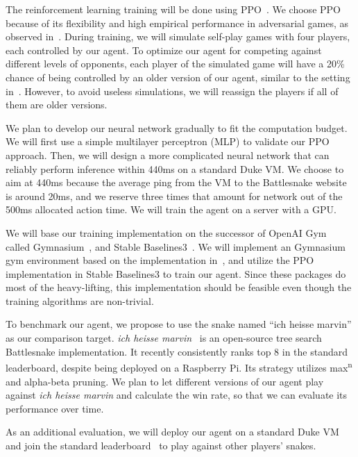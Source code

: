 \documentclass[a4paper]{article}
\begin{document}
The reinforcement learning training will be done using
PPO~\cite{schulman2017proximal}.
We choose PPO because of its flexibility and high empirical performance in
adversarial games,
as observed
in~\cite{berner2019dota,binnersley2020battlesnake,chung2020battlesnake}.
During training, we will simulate self-play games with four players,
each controlled by our agent.
To optimize our agent for competing against different levels of opponents,
each player of the simulated game will have a 20\% chance of being controlled by
an older version of our agent,
similar to the setting in~\cite{silver2017mastering}. However,
to avoid useless simulations,
we will reassign the players if all of them are older versions.

We plan to develop our neural network gradually to fit the computation budget.
We will first use a simple multilayer perceptron (MLP)
to validate our PPO approach. Then,
we will design a more complicated neural network that can reliably perform
inference within 440ms on a standard Duke VM.
We choose to aim at 440ms because the average ping from the VM to the
Battlesnake website is around 20ms,
and we reserve three times that amount for network out of the 500ms allocated
action time. We will train the agent on a server with a GPU.

We will base our training implementation on the successor of OpenAI
Gym~\cite{brockman2016openai} called Gymnasium~\cite{farama2024gymnasium},
and Stable Baselines3~\cite{raffin2024stable}.
We will implement an Gymnasium gym environment based on the implementation
in~\cite{chung2020battlesnake},
and utilize the PPO implementation in Stable Baselines3 to train our agent.
Since these packages do most of the heavy-lifting,
this implementation should be feasible even though the training algorithms are
non-trivial.

To benchmark our agent,
we propose to use the snake named ``ich heisse marvin'' as our comparison
target. \emph{ich heisse marvin}~\cite{wrenger2024rusty}
is an open-source tree search Battlesnake implementation.
It recently consistently ranks top 8 in the standard leaderboard,
despite being deployed on a Raspberry Pi. Its strategy utilizes
max\textsuperscript{n} and alpha-beta pruning.
We plan to let different versions of our agent play against \emph{ich heisse
    marvin} and calculate the win rate,
so that we can evaluate its performance over time.

As an additional evaluation,
we will deploy our agent on a standard Duke VM and join the standard
leaderboard~\cite{standard_leaderboard} to play against other players' snakes.
\end{document}
